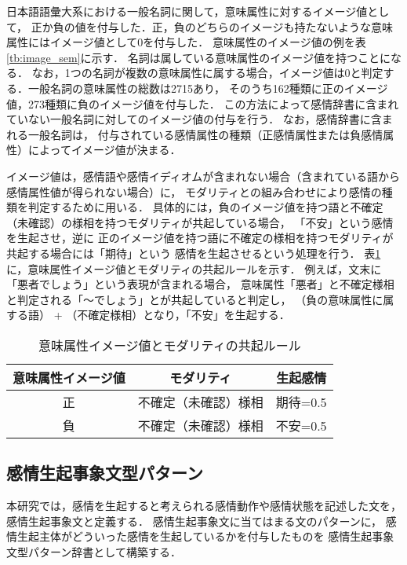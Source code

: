 \documentclass[japanese]{jnlp_1.3c}
\begin{document}
日本語語彙大系における一般名詞に関して，意味属性に対するイメージ値として，
正か負の値を付与した．正，負のどちらのイメージも持たないような意味属性にはイメージ値として0を付与した．
意味属性のイメージ値の例を表\ref{tb:image_sem}に示す．
名詞は属している意味属性のイメージ値を持つことになる．
なお，1つの名詞が複数の意味属性に属する場合，イメージ値は0と判定する．一般名詞の意味属性の総数は2715あり，
そのうち162種類に正のイメージ値，273種類に負のイメージ値を付与した．
この方法によって感情辞書に含まれていない一般名詞に対してのイメージ値の付与を行う．
なお，感情辞書に含まれる一般名詞は，
付与されている感情属性の種類（正感情属性または負感情属性）によってイメージ値が決まる．

イメージ値は，感情語や感情イディオムが含まれない場合（含まれている語から感情属性値が得られない場合）に，
モダリティとの組み合わせにより感情の種類を判定するために用いる．
具体的には，負のイメージ値を持つ語と不確定（未確認）の様相を持つモダリティが共起している場合，
「不安」という感情を生起させ，逆に
正のイメージ値を持つ語に不確定の様相を持つモダリティが共起する場合には「期待」という
感情を生起させるという処理を行う．
表\ref{tb:imvrule}に，意味属性イメージ値とモダリティの共起ルールを示す．
例えば，文末に「悪者でしょう」という表現が含まれる場合，
意味属性「悪者」と不確定様相と判定される「〜でしょう」とが共起していると判定し，
（負の意味属性に属する語） + （不確定様相）となり，「不安」を生起する．

\begin{table}[t]
\begin{center}
\caption{意味属性イメージ値とモダリティの共起ルール}
\begin{tabular}{|c|c|c|}
\hline
意味属性イメージ値	&	モダリティ	&	生起感情	\\ \hline \hline
正	&	不確定（未確認）様相	&	期待=0.5	\\ \hline
負	&	不確定（未確認）様相	&	不安=0.5	\\ \hline
\end{tabular}
\label{tb:imvrule}
\end{center}
\end{table}

\subsection{感情生起事象文型パターン}

本研究では，感情を生起すると考えられる感情動作や感情状態を記述した文を，
感情生起事象文と定義する．
感情生起事象文に当てはまる文のパターンに，
感情生起主体がどういった感情を生起しているかを付与したものを
感情生起事象文型パターン辞書として構築する．
\end{document}
